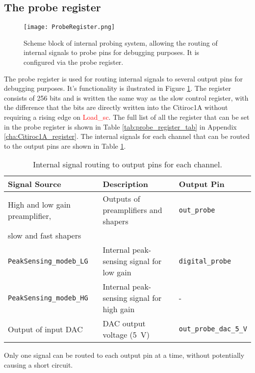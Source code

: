 \subsection{The probe register}
\begin{figure}[H]
    \centering
    \texttt{[image: ProbeRegister.png]}
    \caption{Scheme block of internal probing system, allowing the routing of internal signals to probe pins for debugging purposes. It is configured via the probe register.\autocite{datasheetCITIROC}}
    \label{fig:CITIROC1A_proberegiseter}
\end{figure}
The probe register is used for routing internal signals to several output pins for debugging purposes.
It's functionality is ilustrated in Figure \ref{fig:CITIROC1A_proberegiseter}.
The register consists of 256 bits and is written the same way as the slow control register,
 with the difference that the bits are directly written into the Citiroc1A without requiring a rising edge on \textcolor{red}{Load\_sc}.\autocite{datasheetCITIROC}
\newline
 The full list of all the register that can be set in the probe register is shown in Table \ref{tab:probe_register_tab} in Appendix \ref{cha:Citiroc1A_register}.
\newline
The internal signals for each channel that can be routed to the output pins are shown in Table \ref{tab:probe_register}. 
 \begin{table}[h]
    \centering
    \begin{tabular}{@{}lll@{}}
    \toprule
    \textbf{Signal Source} & \textbf{Description}                   & \textbf{Output Pin}        \\ \midrule
    High and low gain preamplifier, & Outputs of preamplifiers and shapers & \texttt{out\_probe}        \\
    slow and fast shapers                                                   &                          \\ \midrule
    \texttt{PeakSensing\_modeb\_LG} & Internal peak-sensing signal for low gain & \texttt{digital\_probe}    \\
    \texttt{PeakSensing\_modeb\_HG} & Internal peak-sensing signal for high gain & -    \\ \midrule
    Output of input DAC            & DAC output voltage (\SI{5}{\volt})  & \texttt{out\_probe\_dac\_5\_V} \\ \bottomrule
    \end{tabular}
    \caption{Internal signal routing to output pins for each channel.}
    \label{tab:probe_register}
\end{table}
\newline
Only one signal can be routed to each output pin at a time, without potentially causing a short circuit.\autocite{datasheetCITIROC}









 

